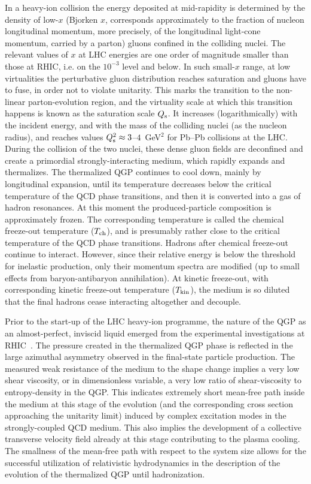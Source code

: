 In a heavy-ion collision the energy deposited at mid-rapidity is determined by the density of low-$x$ (Bjorken $x$, corresponds approximately to the fraction of nucleon longitudinal momentum, more precisely, of the longitudinal light-cone momentum, carried by a parton) gluons confined in the colliding nuclei. The relevant values of $x$ at LHC energies are one order of magnitude smaller than those at RHIC, i.e. on the $10^{-3}$ level and below. In such small-$x$ range, at low virtualities the perturbative gluon distribution reaches saturation and gluons have to fuse, in order not to violate unitarity.  This marks the transition to the non-linear parton-evolution region, and the virtuality scale at which this transition happens is known as the saturation scale $Q_{\rm s}$. It increases (logarithmically) with the incident energy, and with the mass of the colliding nuclei (as the nucleon radius), and  reaches values $Q_{\rm s}^2 \approx 3$--$4$~GeV$^2$ for Pb--Pb collisions at the LHC. During the collision of the two nuclei, these dense gluon fields are deconfined and create a primordial strongly-interacting medium, which rapidly expands and thermalizes. The thermalized QGP continues to cool down, mainly by longitudinal expansion, until its temperature decreases below the critical temperature of the QCD phase transitions, and then it is converted into a gas of hadron resonances. At this moment the produced-particle composition is approximately frozen. The corresponding temperature is called the chemical freeze-out temperature ($T_{\rm ch}$), and is presumably rather close to the critical temperature of the QCD phase transitions. Hadrons after chemical freeze-out continue to interact. However, since their relative energy is below the threshold for inelastic production, only their momentum spectra are modified (up to small effects from baryon-antibaryon annihilation). At kinetic freeze-out, with corresponding kinetic freeze-out temperature ($T_{\rm kin}$), the medium is so diluted that the final hadrons cease interacting altogether and decouple.

Prior to the start-up of the LHC heavy-ion programme, the nature of the QGP as an almost-perfect, inviscid liquid emerged from the experimental investigations at RHIC~\cite{Tribble:2007nsac}. The pressure created in the thermalized QGP phase is reflected in the large azimuthal asymmetry observed in the final-state particle production. The measured weak  resistance of the medium  to the shape change implies a very low shear viscosity, or in dimensionless variable, a very low ratio of shear-viscosity to entropy-density in the QGP. This indicates extremely short mean-free path inside the medium at this stage of the evolution (and the corresponding cross section approaching the unitarity limit) induced by complex excitation modes in the strongly-coupled QCD medium. This also implies the development of a collective transverse velocity field already at this stage contributing to the plasma cooling. The smallness of the mean-free path with respect to the system size allows for the successful utilization of relativistic hydrodynamics in the description of the evolution of the thermalized QGP until hadronization.

